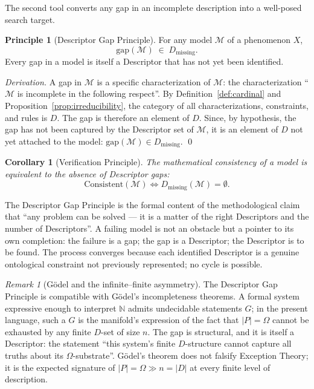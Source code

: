 \documentclass[11pt,a4paper]{article}
\newtheorem{corollary}[theorem]{Corollary}
\theoremstyle{definition}
\newtheorem{principle}[theorem]{Principle}
\theoremstyle{remark}
\newtheorem{remark}[theorem]{Remark}
\begin{document}
The second tool converts any gap in an incomplete description into a well-posed search target.

\begin{principle}[Descriptor Gap Principle]\label{princ:descriptor-gap}
For any model $\mathcal{M}$ of a phenomenon $X$,
\[
\boxed{\;\mathrm{gap}(\mathcal{M}) \;\in\; D_{\mathrm{missing}}.\;}
\]
Every gap in a model is itself a Descriptor that has not yet been identified.
\end{principle}

\begin{proof}[Derivation]
A gap in $\mathcal{M}$ is a specific characterization of $\mathcal{M}$: the characterization ``$\mathcal{M}$ is incomplete in the following respect''. By Definition~\ref{def:cardinal} and Proposition~\ref{prop:irreducibility}, the category of all characterizations, constraints, and rules is $D$. The gap is therefore an element of $D$. Since, by hypothesis, the gap has not been captured by the Descriptor set of $\mathcal{M}$, it is an element of $D$ not yet attached to the model: $\mathrm{gap}(\mathcal{M})\in D_{\mathrm{missing}}$. \qed
\end{proof}

\begin{corollary}[Verification Principle]\label{cor:verification}
The mathematical consistency of a model is equivalent to the absence of Descriptor gaps:
\[
\mathrm{Consistent}(\mathcal{M}) \iff D_{\mathrm{missing}}(\mathcal{M}) = \emptyset.
\]
\end{corollary}

The Descriptor Gap Principle is the formal content of the methodological claim that ``any problem can be solved --- it is a matter of the right Descriptors and the number of Descriptors''. A failing model is not an obstacle but a pointer to its own completion: the failure is a gap; the gap is a Descriptor; the Descriptor is to be found. The process converges because each identified Descriptor is a genuine ontological constraint not previously represented; no cycle is possible.

\begin{remark}[Gödel and the infinite--finite asymmetry]\label{rem:godel-asymmetry}
The Descriptor Gap Principle is compatible with Gödel's incompleteness theorems. A formal system expressive enough to interpret $\mathbb{N}$ admits undecidable statements $G$; in the present language, such a $G$ is the manifold's expression of the fact that $|P|=\Omega$ cannot be exhausted by any finite $D$-set of size $n$. The gap is structural, and it is itself a Descriptor: the statement ``this system's finite $D$-structure cannot capture all truths about its $\Omega$-substrate''. Gödel's theorem does not falsify Exception Theory; it is the expected signature of $|P|=\Omega \gg n = |D|$ at every finite level of description.
\end{remark}
\end{document}
